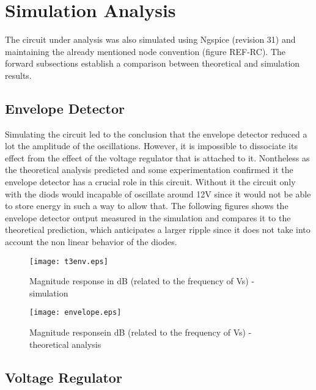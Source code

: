 \section{Simulation Analysis}
\label{sec:simulation}

The circuit under analysis was also simulated using Ngspice (revision 31) and maintaining the already mentioned node convention (figure REF-RC). The forward subsections establish a comparison between theoretical and simulation results.

\subsection{Envelope Detector}

Simulating the circuit led to the conclusion that the envelope detector reduced a lot the amplitude of the oscillations. However, it is impossible to dissociate its effect from the effect of the voltage regulator that is attached to it. Nontheless as the theoretical analysis predicted and some experimentation confirmed it the envelope detector has a crucial role in this circuit. Without it the circuit only with the diods would incapable of oscillate around 12V since it would not be able to store energy in such a way to allow that. The following figures shows the envelope detector output measured in the simulation and compares it to the theoretical prediction, which anticipates a larger ripple since it does not take into account the non linear behavior of the diodes. 


\begin{figure}[h] \centering
  \begin{minipage}{.5\textwidth}
    \texttt{[image: t3env.eps]}
    \caption{Magnitude response in dB (related to the frequency of Vs) - simulation}
    \label{fig:simenv}
    \end{minipage}
  \begin{minipage}{.5\textwidth}
  \centering
    \texttt{[image: envelope.eps]}
    \caption{Magnitude responsein dB (related to the frequency of Vs) - theoretical analysis }
    \label{fig:compenv}
      \end{minipage}
\end{figure}

\subsection{Voltage Regulator}

